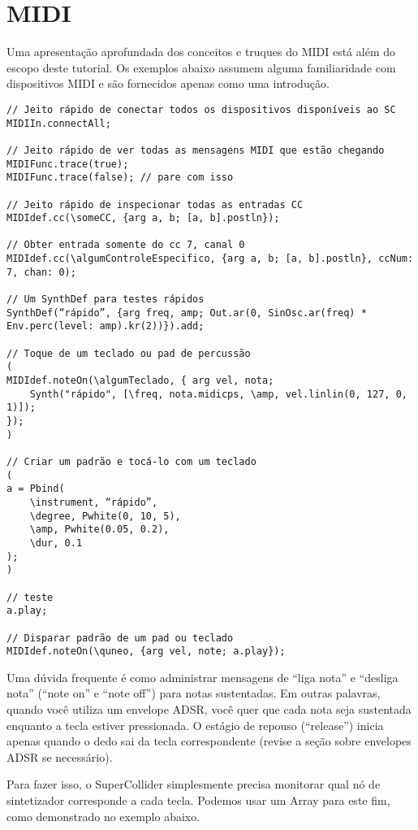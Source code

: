 \section{MIDI}

Uma apresentação aprofundada dos conceitos e truques do MIDI está além do escopo deste tutorial. Os exemplos abaixo assumem alguma familiaridade com dispositivos MIDI e são fornecidos apenas como uma introdução.


\begin{lstlisting}[style=SuperCollider-IDE, basicstyle=\scttfamily\footnotesize]
// Jeito rápido de conectar todos os dispositivos disponíveis ao SC
MIDIIn.connectAll;

// Jeito rápido de ver todas as mensagens MIDI que estão chegando
MIDIFunc.trace(true);
MIDIFunc.trace(false); // pare com isso

// Jeito rápido de inspecionar todas as entradas CC
MIDIdef.cc(\someCC, {arg a, b; [a, b].postln});

// Obter entrada somente do cc 7, canal 0
MIDIdef.cc(\algumControleEspecifico, {arg a, b; [a, b].postln}, ccNum: 7, chan: 0);

// Um SynthDef para testes rápidos
SynthDef(“rápido”, {arg freq, amp; Out.ar(0, SinOsc.ar(freq) * Env.perc(level: amp).kr(2))}).add;

// Toque de um teclado ou pad de percussão
(
MIDIdef.noteOn(\algumTeclado, { arg vel, nota;
	Synth("rápido", [\freq, nota.midicps, \amp, vel.linlin(0, 127, 0, 1)]);
});
)

// Criar um padrão e tocá-lo com um teclado
(
a = Pbind(
	\instrument, “rápido”,
	\degree, Pwhite(0, 10, 5),
	\amp, Pwhite(0.05, 0.2),
	\dur, 0.1
);
)

// teste
a.play;

// Disparar padrão de um pad ou teclado
MIDIdef.noteOn(\quneo, {arg vel, note; a.play});
\end{lstlisting}

Uma dúvida frequente é como administrar mensagens de “liga nota” e “desliga nota” (“note on” e “note off”) para notas sustentadas. Em outras palavras, quando você utiliza um envelope ADSR, você quer que cada nota seja sustentada enquanto a tecla estiver pressionada. O estágio de repouso (“release”) inicia apenas quando o dedo sai da tecla correspondente (revise a seção sobre envelopes ADSR se necessário).

Para fazer isso, o SuperCollider simplesmente precisa monitorar qual nó de sintetizador corresponde a cada tecla. Podemos usar um Array para este fim, como demonstrado no exemplo abaixo. 

